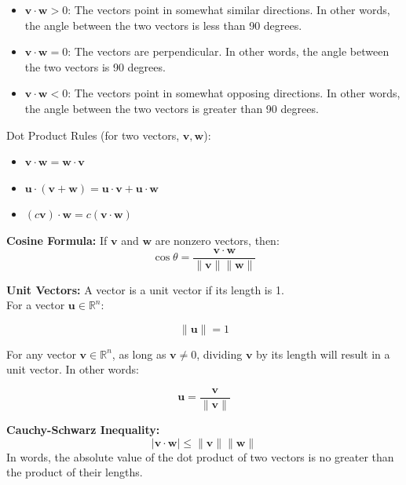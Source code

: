 \documentclass[11pt]{article}
\begin{document}
\begin{itemize}
    \item $ \boldsymbol{v} \cdot \boldsymbol{w} > 0 $: The vectors point in somewhat similar 
    directions. In other words, the angle between the two vectors is less than 90 degrees.
    \item $ \boldsymbol{v} \cdot \boldsymbol{w} = 0 $: The vectors are perpendicular. In other 
    words, the angle between the two vectors is 90 degrees.
    \item $ \boldsymbol{v} \cdot \boldsymbol{w} < 0 $: The vectors point in somewhat opposing 
    directions. In other words, the angle between the two vectors is greater than 90 degrees.
\end{itemize}

Dot Product Rules (for two vectors, $\boldsymbol{v}, \boldsymbol{w}$):
\begin{itemize}
    \item $ \boldsymbol{v} \cdot \boldsymbol{w} = \boldsymbol{w} \cdot \boldsymbol{v} $
    \item $ \boldsymbol{u} \cdot (\boldsymbol{v} + \boldsymbol{w}) = \boldsymbol{u} \cdot 
    \boldsymbol{v} + \boldsymbol{u} \cdot \boldsymbol{w} $
    \item $ (c\boldsymbol{v}) \cdot \boldsymbol{w} = c(\boldsymbol{v} \cdot \boldsymbol{w}) $
\end{itemize}

\textbf{Cosine Formula:} If $\boldsymbol{v}$ and $\boldsymbol{w}$ are nonzero vectors, then:
\[ \cos \theta = \frac{\boldsymbol{v} \cdot \boldsymbol{w}}{\|\boldsymbol{v}\| \|\boldsymbol{w}
\|}\]

\textbf{Unit Vectors:} A vector is a unit vector if its length is 1. \\
For a vector $\boldsymbol{u} \in \mathbb{R}^n$:

\[ \|\boldsymbol{u}\| = 1\]

For any vector $\boldsymbol{v} \in \mathbb{R}^n$, as long as $\boldsymbol{v} \ne 0$, dividing 
$\boldsymbol{v}$ by its length will result in a unit vector. In other words:

\[ \boldsymbol{u} = \frac{\boldsymbol{v}}{\|\boldsymbol{v}\|} \]

\textbf{Cauchy-Schwarz Inequality:} 
\[ | \boldsymbol{v} \cdot \boldsymbol{w} | \le \|\boldsymbol{v}\|  \|\boldsymbol{w}\| \]
In words, the absolute value of the dot product of two vectors is no greater than the product 
of their lengths. \\
\end{document}
